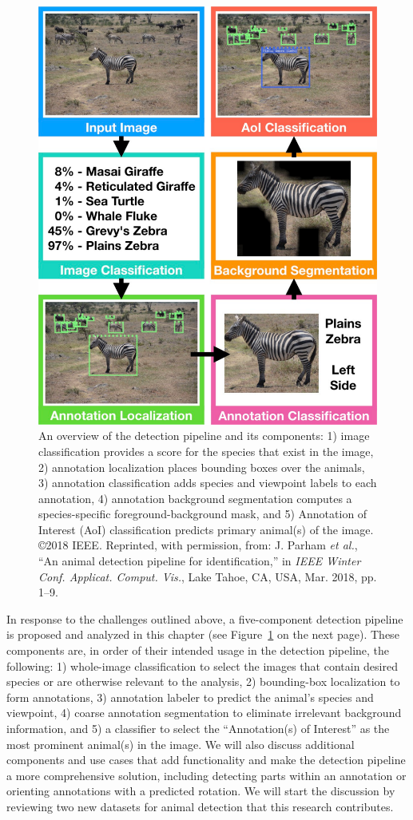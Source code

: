 \begin{figure}[!t]
    \begin{center}
        \includegraphics[width=0.8\linewidth]{resources/pipeline.pdf}
    \end{center}
    \caption{An overview of the detection pipeline and its components: 1) image classification provides a score for the species that exist in the image, 2) annotation localization places bounding boxes over the animals, 3) annotation classification adds species and viewpoint labels to each annotation, 4) annotation background segmentation computes a species-specific foreground-background mask, and 5) Annotation of Interest (AoI) classification predicts primary animal(s) of the image.  \copyright 2018 IEEE. Reprinted, with permission, from: J. Parham \textit{et al.}, ``An animal detection pipeline for identification,'' in \textit{IEEE Winter Conf. Applicat. Comput. Vis.}, Lake Tahoe, CA, USA, Mar. 2018, pp. 1–9.}
    \label{fig:pipeline}
\end{figure}

In response to the challenges outlined above, a five-component detection pipeline is proposed and analyzed in this chapter (see Figure~\ref{fig:pipeline} on the next page).  These components are, in order of their intended usage in the detection pipeline, the following: 1) whole-image classification to select the images that contain desired species or are otherwise relevant to the analysis, 2) bounding-box localization to form annotations, 3) annotation labeler to predict the animal's species and viewpoint, 4) coarse annotation segmentation to eliminate irrelevant background information, and 5) a classifier to select the ``Annotation(s) of Interest'' as the most prominent animal(s) in the image.  We will also discuss additional components and use cases that add functionality and make the detection pipeline a more comprehensive solution, including detecting parts within an annotation or orienting annotations with a predicted rotation.  We will start the discussion by reviewing two new datasets for animal detection that this research contributes.

